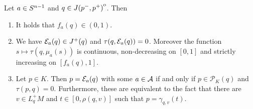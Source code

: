\begin{lemma}\label{lem:observationtime}
Let $a\in {S^{n-1}}$ and $q \in {\kern0ptJ(p^-,p^+)}^{\mathrm{o}}$. Then
\begin{enumerate}[label={\textnormal{(\arabic*)}}]
    \item It holds that $f_a(q)\in (0,1)$.
    \item We have ${\mathcal{E}}_a(q)\in J^+(q)$ and $\tau(q,{\mathcal{E}}_a(q))=0$. Moreover the function $s\mapsto\tau(q,\mu_a(s))$ is continuous, non-decreasing on $[0,1]$ and strictly increasing on $[f_a(q),1]$.
    \item Let $p\in K$. Then $p={\mathcal{E}}_a(q)$ with some $a\in \mathcal{A}$ if and only if $p\in \mathcal{P}_K(q)$ and $\tau(p,q)=0$. Furthermore, these are equivalent to the fact that there are $v\in L^+_qM$ and $t\in[0,\rho(q,v)]$ such that $p=\gamma_{q,v}(t)$.
\end{enumerate}
\end{lemma}
